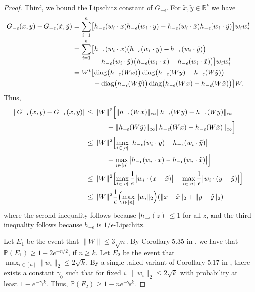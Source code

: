 \documentclass[11pt]{article}
\newcommand{\R}{\mathbb{R}}
\newcommand{\eps}{\epsilon}
\newcommand{\xtilde}{\tilde{x}}
\newcommand{\PP}{\mathbb{P}}
\newcommand{\tran}{t}
\newcommand{\Wt}{W^\tran}
\newcommand{\wi}{w_i}
\newcommand{\wix}{w_i \cdot x}
\newcommand{\wixtilde}{w_i \cdot \xtilde}
\newcommand{\wiytilde}{w_i \cdot \ytilde}
\newcommand{\wiy}{w_i \cdot y}
\newcommand{\wit}{w_i^\tran}
\newcommand{\hmeps}{h_{-\eps}}
\newcommand{\Gmeps}{G_{-\eps}}
\newcommand{\wiwit}{\wi\wit}
\newcommand{\ytilde}{\tilde{y}}
\DeclareMathOperator{\diag}{diag}
\begin{document}
\begin{proof}
Third, we bound the Lipschitz constant of $\Gmeps$.  For $\xtilde, \ytilde \in \R^k$ we have
\begin{align}
\Gmeps(x, y) - \Gmeps(\xtilde, \ytilde) &= \sum_{i=1}^n \bigl[ \hmeps(\wix) \hmeps(\wiy) - \hmeps(\wixtilde) \hmeps(\wiytilde) \bigr] \wiwit \notag \\
&= \sum_{i=1}^n \bigl[ \hmeps(\wix) \bigl(\hmeps(\wiy) - \hmeps(\wiytilde) \bigr)  \notag \\[-.75em]
&\quad \quad\quad + \hmeps(\wiytilde) \bigl(\hmeps(\wix) - \hmeps(\wixtilde) \bigr)  \bigr] \wiwit \notag \\
&= \Wt \bigl[ \diag \bigl( \hmeps(Wx) \bigr) \diag \bigl(\hmeps(Wy) - \hmeps(W\ytilde) \bigr) \notag\\
&\quad \quad \quad+  \diag \bigl( \hmeps(W \ytilde) \bigr) \diag \bigl(\hmeps(Wx) - \hmeps(W\xtilde) \bigr)  \bigr] W. \notag
\end{align}
Thus,
\begin{align*}
\| \Gmeps(x,y) - \Gmeps(\xtilde, \ytilde) \| 
&\leq \| W\|^2  \Bigl[  \| \hmeps(W x)\|_\infty  \|  \hmeps(Wy) - \hmeps(W\ytilde) \|_\infty \notag \\
&\quad \quad \quad +  \| \hmeps(W \ytilde)\|_\infty  \|  \hmeps(Wx) - \hmeps(W\xtilde) \|_\infty  \Bigr ] \\
&\leq  \| W\|^2 \Bigl[ \max_{i \in [n]} \big | \hmeps(\wiy) - \hmeps(\wiytilde) \big|  \notag \\
& \quad \quad \quad  +\max_{i \in [n]}\big | \hmeps(\wix) - \hmeps(\wixtilde) \big|  \Bigr ] \\
&\leq \|W\|^2 \Bigl[ \max_{i \in [n]} \frac{1}{\eps} \big| \wi \cdot(x-\xtilde) \big| + \max_{i \in [n]} \frac{1}{\eps} \big| \wi \cdot(y-\ytilde) \big|  \Bigr] \\
&\leq \|W\|^2 \frac{1}{\eps} \Bigl(\max_{i \in [n]} \| \wi\|_2 \Bigr) ( \| x-\xtilde \|_2  +  \| y-\ytilde \|_2 ) 
\end{align*}
where the second inequality follows because $|\hmeps(z)| \leq 1$ for all $z$, and the third inequality follows because $\hmeps$ is $1/\eps$-Lipschitz.

Let $E_1$ be the event that $\|W\| \leq 3 \sqrt{n}$.  By Corollary 5.35 in \cite{V2012}, we have that $\PP(E_1) \geq 1 - 2e^{-n/2}$, if $n \geq k$.  Let $E_2$ be the event that $\max_{i \in [n]} \|\wi \|_2 \leq 2 \sqrt{k}$.    By a single-tailed variant of Corollary 5.17 in \cite{V2012}, there exists a constant $\gamma_0$ such that for fixed $i$,  $\| \wi\|_2 \leq 2 \sqrt{k}$ with probability at least $1 - e^{-\gamma_0 k}$.  Thus, $\PP(E_2) \geq 1- n e^{-\gamma_0 k}$. 


\end{proof}
\end{document}
